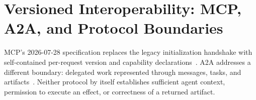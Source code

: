 \chapter{Versioned Interoperability: MCP, A2A, and Protocol Boundaries}\label{ch:C19}

MCP's 2026-07-28 specification replaces the legacy initialization handshake with self-contained per-request version and capability declarations~\cite{mcp2026spec,mcp2026schema}. A2A addresses a different boundary: delegated work represented through messages, tasks, and artifacts~\cite{a2a2026task}. Neither protocol by itself establishes sufficient agent context, permission to execute an effect, or correctness of a returned artifact.









